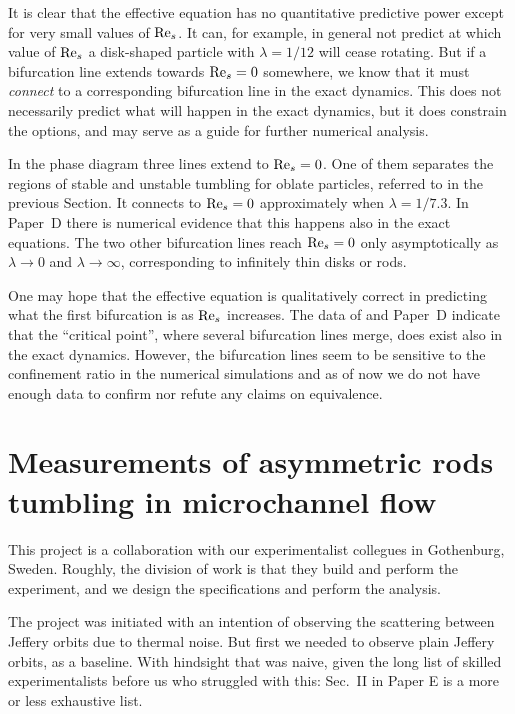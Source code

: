 \documentclass[thesis.tex]{subfiles}
\begin{document}
It is clear that the effective equation has no quantitative predictive power except for very small values of $\textrm{Re}_s$. It can, for example, in general not predict at which value of $\textrm{Re}_s$ a disk-shaped particle with $\lambda=1/12$ will cease rotating. But if a bifurcation line extends towards $\textrm{Re}_s=0$ somewhere, we know that it must \emph{connect} to a corresponding bifurcation line in the exact dynamics. This does not necessarily predict what will happen in the exact dynamics, but it does constrain the options, and may serve as a guide for further numerical analysis.

In the phase diagram three lines extend to $\textrm{Re}_s=0$. One of them separates the regions of stable and unstable tumbling for oblate particles, referred to in the previous Section. It connects to $\textrm{Re}_s=0$ approximately when $\lambda=1/7.3$. In Paper~D there is numerical evidence that this happens also in the exact equations. The two other bifurcation lines reach $\textrm{Re}_s=0$ only asymptotically as $\lambda\to0$ and $\lambda\to\infty$, corresponding to infinitely thin disks or rods.

One may hope that the effective equation is qualitatively correct in predicting what the first bifurcation is as $\textrm{Re}_s$ increases. The data of \citet{rosen2015b} and Paper~D indicate that the ``critical point'', where several bifurcation lines merge, does exist also in the exact dynamics. However, the bifurcation lines seem to be sensitive to the confinement ratio in the numerical simulations and as of now we do not have enough data to confirm nor refute any claims on equivalence.

\chapter{Measurements of asymmetric rods tumbling in microchannel flow}

This project is a collaboration with our experimentalist collegues in Gothenburg, Sweden. Roughly, the division of work is that they build and perform the experiment, and we design the specifications and perform the analysis.

The project was initiated with an intention of observing the scattering between Jeffery orbits due to thermal noise. But first we needed to observe plain Jeffery orbits, as a baseline. With hindsight that was naive, given the long list of skilled experimentalists before us who struggled with this: Sec.~II in Paper E is a more or less exhaustive list. 
\end{document}

